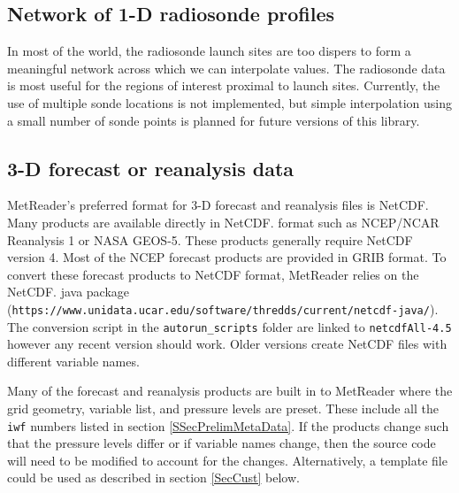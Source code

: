 \documentclass[11pt]{article}   %
\begin{document}
\subsection{Network of 1-D radiosonde profiles}
In most of the world, the radiosonde launch sites are too dispers to form
a meaningful network across which we can interpolate values.  The radiosonde
data is most useful for the regions of interest proximal to launch sites.
Currently, the use of multiple sonde locations is not implemented, but simple
interpolation using a small number of sonde points is planned for future
versions of this library.

\subsection{3-D forecast or reanalysis data}
MetReader's preferred format for 3-D forecast and reanalysis files is NetCDF.  Many
products are available directly in NetCDF. format such as NCEP/NCAR Reanalysis 1 or
NASA GEOS-5.  These products generally require NetCDF version 4.  Most of the NCEP
forecast products are provided in GRIB format.  To convert these forecast products
to NetCDF format, MetReader relies on the NetCDF. java package\\
(\texttt{https://www.unidata.ucar.edu/software/thredds/current/netcdf-java/}).  The
conversion script in the \texttt{autorun\_scripts} folder are linked to \texttt{netcdfAll-4.5}
however any recent version should work.  Older versions create NetCDF files with
different variable names.

Many of the forecast and reanalysis products are built in to MetReader where the
grid geometry, variable list, and pressure levels are preset.  These include all
the \texttt{iwf} numbers listed in section \ref{SSecPrelimMetaData}.  If the
products change such that the pressure levels differ or if variable names change,
then the source code will need to be modified to account for the changes.
Alternatively, a template file could be used as described in section \ref{SecCust} below.
\end{document}
